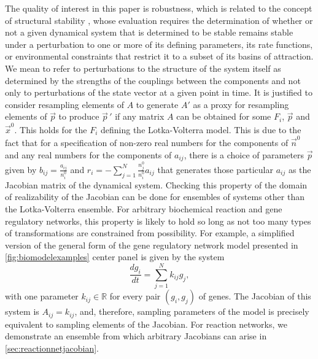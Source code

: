 The quality of interest in this paper is robustness, which is related to the concept of structural stability \cite{Smale1967}, whose evaluation requires the determination of whether or not a given dynamical system that is determined to be stable remains stable under a perturbation to one or more of its defining parameters, its rate functions, or environmental constraints that restrict it to a subset of its basins of attraction. We mean to refer to perturbations to the structure of the system itself as determined by the strengths of the couplings between the components and not only to perturbations of the state vector at a given point in time. It is justified to consider resampling elements of $A$ to generate $A'$ as a proxy for resampling elements of $\vec{p}$ to produce $\vec{p}\,'$ if any matrix $A$ can be obtained for some $F_i$, $\vec{p}$ and $\vec{x}^0$. This holds for the $F_i$ defining the Lotka-Volterra model. This is due to the fact that for a specification of non-zero real numbers for the components of $\vec{n}^0$ and any real numbers for the components of $a_{ij}$, there is a choice of parameters $\vec{p}$ given by $b_{ij} = \frac{a_{ij}}{n_i^0}$ and $r_i = - \sum_{j=1}^N \frac{n_j^0}{n_i^0} a_{ij}$ that generates those particular $a_{ij}$ as the Jacobian matrix of the dynamical system. Checking this property of the domain of realizability of the Jacobian can be done for ensembles of systems other than the Lotka-Volterra ensemble. For arbitrary biochemical reaction and gene regulatory networks, this property is likely to hold so long as not too many types of transformations are constrained from possibility. For example, a simplified version of the general form of the gene regulatory network model presented in \ref{fig:biomodelexamples} center panel is given by the system
\begin{equation}
\frac{dg_i}{dt} = \sum_{j=1}^N k_{ij} g_j,
\end{equation}
with one parameter $k_{ij} \in \mathbb{R}$ for every pair $(g_i,g_j)$ of genes. The Jacobian of this system is $A_{ij} = k_{ij}$, and, therefore, sampling parameters of the model is precisely equivalent to sampling elements of the Jacobian. For reaction networks, we demonstrate an ensemble from which arbitrary Jacobians can arise in \ref{sec:reactionnetjacobian}.

